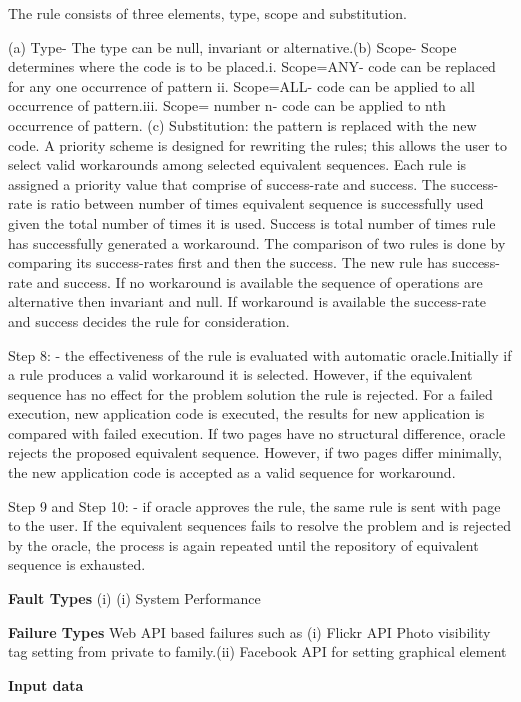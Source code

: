 \begin{compactitem}



The rule consists of three elements, type, scope and substitution. 

(a) Type- The type can be null, invariant or alternative.(b) Scope- Scope determines where the code is to be placed.i.       Scope=ANY- code can be replaced for any one occurrence of pattern
ii. Scope=ALL- code can be applied to all occurrence of pattern.iii. Scope= number n- code can be applied to nth occurrence of pattern.
(c) Substitution: the pattern is replaced with the new code. A priority scheme is designed for rewriting the rules; this allows the user to select valid workarounds among selected equivalent sequences. Each rule is assigned a priority value that comprise of success-rate and success. The success-rate is ratio between number of times equivalent sequence is successfully used given the total number of times it is used. Success is total number of times rule has successfully generated a workaround. The comparison of two rules is done by comparing its success-rates first and then the success. The new rule has success-rate and success. If no workaround is available the sequence of operations are alternative then invariant and null. If workaround is available the success-rate and success decides the rule for consideration.

Step 8: - the effectiveness of the rule is evaluated with automatic oracle.Initially if a rule produces a valid workaround it is selected. However, if the equivalent sequence has no effect for the problem solution the rule is rejected. For a failed execution, new application code is executed, the results for new application is compared with failed execution. If two pages have no structural difference, oracle rejects the proposed equivalent sequence. However, if two pages differ minimally, the new application code is accepted as a valid sequence for workaround.

Step 9 and Step 10: - if oracle approves the rule, the same rule is sent with page to the user.
If the equivalent sequences fails to resolve the problem and is rejected by the oracle, the process is again repeated until the repository of equivalent sequence is exhausted.
\item[\textbf{Fault Types}](i) (i) System Performance
\item[\textbf{Failure Types}]
Web API based failures such as (i) Flickr API Photo visibility tag setting from private to family.(ii) Facebook API for setting graphical element \item[\textbf{Input data}] 


\end{compactitem}
